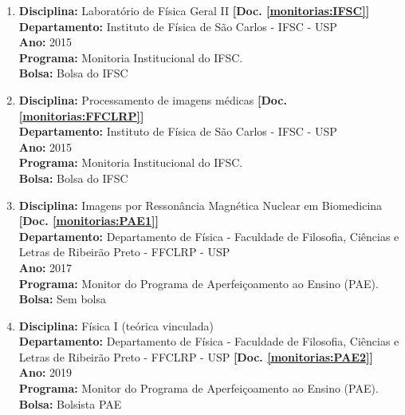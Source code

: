 \documentclass[a4paper,oneside,10pt]{article}
\begin{document}
\begin{enumerate}
\renewcommand{\labelenumi}{{\large\bfseries\arabic{enumi}.}}

\item \textbf{Disciplina:} Laboratório de Física Geral II \textbf{[Doc. \ref{monitorias:IFSC}]}\\
      \textbf{Departamento:} Instituto de Física de São Carlos - IFSC - USP\\
      \textbf{Ano:} 2015\\
      \textbf{Programa:} Monitoria Institucional do IFSC.\\
      \textbf{Bolsa:} Bolsa do IFSC \\

\item \textbf{Disciplina:} Processamento de imagens médicas \textbf{[Doc. \ref{monitorias:FFCLRP}]}\\
      \textbf{Departamento:} Instituto de Física de São Carlos - IFSC - USP\\
      \textbf{Ano:} 2015\\
      \textbf{Programa:} Monitoria Institucional do IFSC.\\
      \textbf{Bolsa:} Bolsa do IFSC \\

\item \textbf{Disciplina:} Imagens por Ressonância Magnética Nuclear em Biomedicina \textbf{[Doc. \ref{monitorias:PAE1}]}\\
      \textbf{Departamento:} Departamento de Física - Faculdade de Filosofia, Ciências e Letras de Ribeirão Preto - FFCLRP - USP\\
      \textbf{Ano:} 2017\\
      \textbf{Programa:} Monitor do Programa de Aperfeiçoamento ao Ensino (PAE).\\
      \textbf{Bolsa:} Sem bolsa \\

\item \textbf{Disciplina:}  Física I (teórica vinculada) \\
      \textbf{Departamento:} Departamento de Física - Faculdade de Filosofia, Ciências e Letras de Ribeirão Preto - FFCLRP - USP \textbf{[Doc. \ref{monitorias:PAE2}]}\\
      \textbf{Ano:} 2019\\
      \textbf{Programa:} Monitor do Programa de Aperfeiçoamento ao Ensino (PAE).\\
      \textbf{Bolsa:} Bolsista PAE \\

\end{enumerate}
\end{document}
